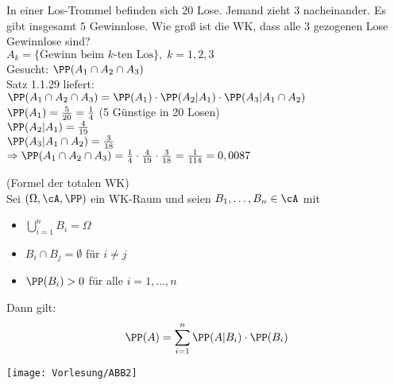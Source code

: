 \documentclass{scrreprt}
\begin{document}
 In einer Los-Trommel befinden sich $20$ Lose. Jemand zieht $3$ nacheinander. Es gibt insgesamt $5$ Gewinnlose. Wie groß ist die WK, dass alle $3$ gezogenen Lose Gewinnlose sind?\\
$A_k=\{\text{Gewinn beim $k$-ten Los}\}, \; k=1,2,3$\\
Gesucht: $\PP(A_1\cap A_2 \cap A_3)$\\
Satz 1.1.29 liefert: \\
$\PP(A_1 \cap A_2 \cap A_3)=\PP(A_1) \cdot \PP(A_2 | A_1) \cdot \PP(A_3 | A_1 \cap A_2)$\\
$\PP(A_1) = \frac{5}{20}= \frac{1}{4}$ (5 Günstige in 20 Losen)\\
$\PP(A_2 | A_1) = \frac{4}{19}$\\
$\PP(A_3 | A_1 \cap A_2) = \frac{3}{18}$\\
$\Rightarrow \PP(A_1 \cap A_2 \cap A_3)=\frac{1}{4}\cdot \frac{4}{19}\cdot \frac{3}{18}=\frac{1}{114}=0,0087$

 (Formel der totalen WK)\\
Sei $(\Omega, \cA, \PP)$ ein WK-Raum und seien $B_1,\dots,B_n \in \cA$ mit 
\begin{itemize}
\item $\bigcup_{i=1}^n B_i = \Omega$
\item $B_i \cap B_j = \emptyset $ für $i \not= j$
\item $\PP (B_i) >0$ für alle $i=1,\dots,n$
\end{itemize}
Dann gilt:
$$\PP(A) = \sum_{i=1}^n \PP(A|B_i) \cdot \PP (B_i)$$
\begin{center}
\texttt{[image: Vorlesung/ABB2]}
\end{center}
\end{document}
